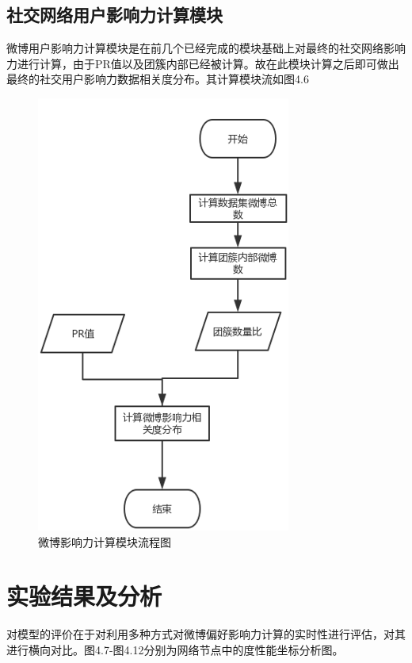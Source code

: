 \subsection{社交网络用户影响力计算模块}
微博用户影响力计算模块是在前几个已经完成的模块基础上对最终的社交网络影响力进行计算，由于PR值以及团簇内部已经被计算。故在此模块计算之后即可做出最终的社交用户影响力数据相关度分布。其计算模块流如图4.6
\begin{figure}[h]
	\centering
	\includegraphics[scale=0.5]{figures/8.png}
	\caption{微博影响力计算模块流程图}
	\label{fig:1}
\end{figure}

\section{实验结果及分析}
对模型的评价在于对利用多种方式对微博偏好影响力计算的实时性进行评估，对其进行横向对比。图4.7-图4.12分别为网络节点中的度性能坐标分析图。


